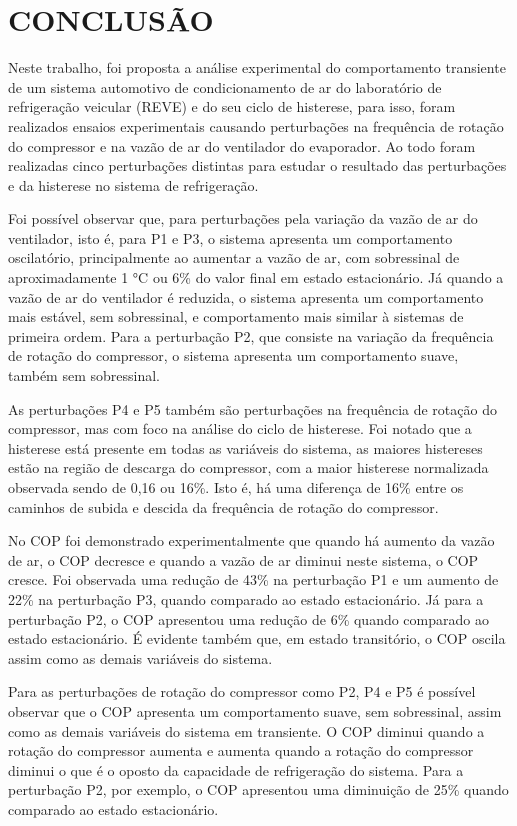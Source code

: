 \section{CONCLUSÃO}

Neste trabalho, foi proposta a análise experimental do comportamento transiente de um sistema automotivo de condicionamento de ar do laboratório de refrigeração veicular (REVE) e do seu ciclo de histerese, para isso, foram realizados ensaios experimentais causando perturbações na frequência de rotação do compressor e na vazão de ar do ventilador do evaporador. Ao todo foram realizadas cinco perturbações distintas para estudar o resultado das perturbações e da histerese no sistema de refrigeração. 

Foi possível observar que, para perturbações pela variação da vazão de ar do ventilador, isto é, para P1 e P3, o sistema apresenta um comportamento oscilatório, principalmente ao aumentar a vazão de ar, com sobressinal de aproximadamente 1 °C ou 6\% do valor final em estado estacionário. Já quando a vazão de ar do ventilador é reduzida, o sistema apresenta um comportamento mais estável, sem sobressinal, e comportamento mais similar à sistemas de primeira ordem. Para a perturbação P2, que consiste na variação da frequência de rotação do compressor, o sistema apresenta um comportamento suave, também sem sobressinal. 

As perturbações P4 e P5 também são perturbações na frequência de rotação do compressor, mas com foco na análise do ciclo de histerese. Foi notado que a histerese está presente em todas as variáveis do sistema, as maiores histereses estão na região de descarga do compressor, com a maior histerese normalizada observada sendo de 0,16 ou 16\%. Isto é, há uma diferença de 16\% entre os caminhos de subida e descida da frequência de rotação do compressor. 

No COP foi demonstrado experimentalmente que quando há aumento da vazão de ar, o COP decresce e quando a vazão de ar diminui neste sistema, o COP cresce. Foi observada uma redução de 43\% na perturbação P1 e um aumento de 22\% na perturbação P3, quando comparado ao estado estacionário. Já para a perturbação P2, o COP apresentou uma redução de 6\% quando comparado ao estado estacionário. É evidente também que, em estado transitório, o COP oscila assim como as demais variáveis do sistema.

Para as perturbações de rotação do compressor como P2, P4 e P5 é possível observar que o COP apresenta um comportamento suave, sem sobressinal, assim como as demais variáveis do sistema em transiente. O COP diminui quando a rotação do compressor aumenta e aumenta quando a rotação do compressor diminui o que é o oposto da capacidade de refrigeração do sistema. Para a perturbação P2, por exemplo, o COP apresentou uma diminuição de 25\% quando comparado ao estado estacionário. 

